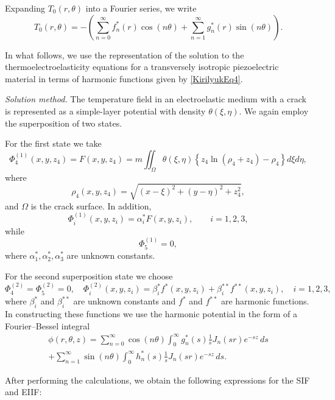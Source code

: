 Expanding $T_0(r,\theta)$ into a Fourier series, we write
\[
T_0(r,\theta)
=
-\left(
\sum_{n=0}^{\infty} f_n^{*}(r)\cos(n\theta)
+
\sum_{n=1}^{\infty} g_n^{*}(r)\sin(n\theta)
\right).
\]

In what follows, we use the representation of the solution to the thermoelectroelasticity equations for a transversely isotropic piezoelectric material in terms of harmonic functions given by \eqref{KirilyukEq4}.

\medskip
\emph{Solution method.}
The temperature field in an electroelastic medium with a crack is represented as a simple-layer potential with density $\theta(\xi,\eta)$. We again employ the superposition of two states.

For the first state we take
\begin{equation}
	\Phi_{4}^{(1)}(x,y,z_{4}) = F(x,y,z_{4})
	=
	m\iint_{\Omega}\theta(\xi,\eta)
	\left\{
	z_{4}\ln(\rho_{4}+z_{4})-\rho_{4}
	\right\}
	d\xi d\eta ,
	\label{KirilyukEq33}
\end{equation}
where
\[
\rho_{4}(x,y,z_{4})=\sqrt{(x-\xi)^{2}+(y-\eta)^{2}+z_{4}^{2}},
\]
and $\Omega$ is the crack surface. In addition,
\[
\Phi_i^{(1)}(x,y,z_i)=\alpha_i^{*}F(x,y,z_i), \qquad i=1,2,3,
\]
while
\[
\Phi_5^{(1)}=0,
\]
where $\alpha_1^{*},\alpha_2^{*},\alpha_3^{*}$ are unknown constants.

For the second superposition state we choose
\[
\Phi_4^{(2)}=\Phi_5^{(2)}=0,
\quad
\Phi_i^{(2)}(x,y,z_i)
=
\beta_i^{*}f^{*}(x,y,z_i)
+
\beta_i^{**}f^{**}(x,y,z_i),
\quad i=1,2,3,
\]
where $\beta_i^{*}$ and $\beta_i^{**}$ are unknown constants and
$f^{*}$ and $f^{**}$ are harmonic functions. In constructing these functions we use the harmonic potential in the form of a Fourier--Bessel integral
\begin{multline}
	\phi(r,\theta,z)
	=
	\sum_{n=0}^{\infty}\cos(n\theta)
	\int_{0}^{\infty} g_n^{*}(s)\frac{1}{s}J_n(sr)e^{-sz}\,ds
	\\
	+
	\sum_{n=1}^{\infty}\sin(n\theta)
	\int_{0}^{\infty} h_n^{*}(s)\frac{1}{s}J_n(sr)e^{-sz}\,ds .
	\label{KirilyukEq34}
\end{multline}

After performing the calculations, we obtain the following expressions for the SIF and EIIF:

